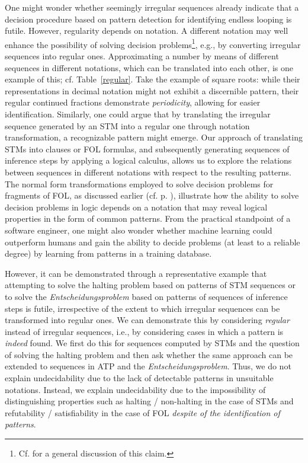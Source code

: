 \documentclass[%
  manuscript=article,   %
  year=2024,
  volume=77,
  doi=10.59203/zfn.77.694,
]{zfn}
\begin{document}
One might wonder whether seemingly irregular sequences already indicate that a decision procedure based on pattern detection for identifying endless looping is futile. However, regularity depends on notation.
A different notation may well enhance the possibility of solving decision problems\footnote{Cf. \parencite{Lampert2} for a general discussion of this claim.}, e.g., by converting irregular sequences into regular ones.
Approximating a number by means of different sequences in different notations, which can be translated into each other, is one example of this; cf. Table~\ref{regular}. Take the example of square roots: while their representations in decimal notation might not exhibit a discernible pattern, their regular continued fractions demonstrate \emph{periodicity}, allowing for easier identification.
Similarly, one could argue that by translating the irregular sequence generated by an STM into a regular one through notation transformation, a recognizable pattern might emerge. Our approach of translating STMs into clauses or FOL formulas, and subsequently generating sequences of inference steps by applying a logical calculus, allows us to explore the relations between sequences in different notations with respect to the resulting patterns.
The normal form transformations employed to solve decision problems for fragments of FOL, as discussed earlier (cf. p. \pageref{normalforms}), illustrate how the ability to solve decision problems in logic depends on a notation that may reveal logical properties in the form of common patterns. From the practical standpoint of a software engineer, one might also wonder whether machine learning could outperform humans and gain the ability to decide problems (at least to a reliable degree) by learning from patterns in a training database.

However, it can be demonstrated through a representative example that attempting to solve the halting problem based on patterns of STM sequences or to solve the \emph{Entscheidungsproblem} based on patterns of sequences of inference steps is futile, irrespective of the extent to which irregular sequences can be transformed into regular ones.
We can demonstrate this by considering \emph{regular} instead of irregular sequences, i.e., by considering cases in which a pattern is \textit{indeed} found. We first do this for sequences computed by STMs and the question of solving the halting problem and then ask whether the same approach can be extended to sequences in ATP and the \emph{Entscheidungsproblem}. Thus, we do not explain undecidability due to the lack of detectable patterns in unsuitable notations. Instead, we explain undecidability due to the impossibility of distinguishing properties such as halting / non-halting in the case of STMs and refutability / satisfiability in the case of FOL \emph{despite of the identification of patterns}. 
\end{document}
